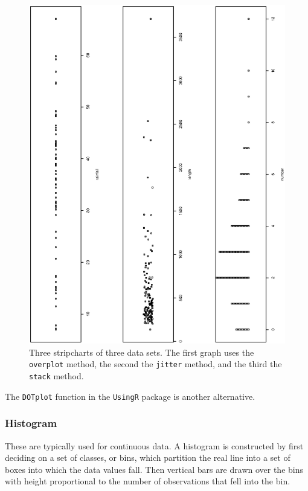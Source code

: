 \documentclass[captions=tableheading]{scrbook}
\begin{document}
  \begin{figure}[th]
    \includegraphics[angle=270, totalheight=4in]{ps/datadesc/stripcharts.ps}
    \caption[Strip charts of \texttt{precip}, \texttt{rivers}, and \texttt{discoveries}]{\small Three stripcharts of three data sets.  The first graph uses the \texttt{overplot} method, the second the \texttt{jitter} method, and the third the \texttt{stack} method.}
    \label{fig:stripcharts}
  \end{figure}


The \texttt{DOTplot} function in the \texttt{UsingR} package \cite{usingr} is another alternative.
\subsubsection{Histogram}
\label{sec-2-1-2-2}


These are typically used for continuous data. A histogram is constructed by first deciding on a set of classes, or bins, which partition the real line into a set of boxes into which the data values fall. Then vertical bars are drawn over the bins with height proportional to the number of observations that fell into the bin. 
\end{document}
